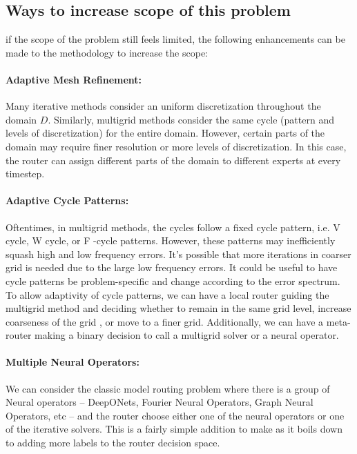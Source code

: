 \documentclass[12pt]{article}
\begin{document}
\subsection{Ways to increase scope of this problem}


if the scope of the problem still feels limited, the following enhancements can be made to the methodology to increase the scope:

\paragraph{Adaptive Mesh Refinement:} Many iterative methods consider an uniform discretization throughout the domain $D$. Similarly, multigrid methods consider the same cycle (pattern and levels of discretization) for the entire domain. However, certain parts of the domain may require finer resolution or more levels of discretization. In this case, the router can assign different parts of the domain to different experts at every timestep. 

\paragraph{Adaptive Cycle Patterns:} Oftentimes, in multigrid methods, the cycles follow a fixed cycle pattern, i.e. V cycle, W cycle, or F -cycle patterns. However, these patterns may inefficiently squash high and low frequency errors. It's possible that more iterations in coarser grid is needed due to the large low frequency errors. It could be useful to have cycle patterns be problem-specific and change according to the error spectrum. To allow adaptivity of cycle patterns, we can have a local router guiding the multigrid method and deciding whether to remain in the same grid level, increase coarseness of the grid , or move to a finer grid. Additionally, we can have a meta-router making a binary decision to call a multigrid solver or a neural operator. 

\paragraph{Multiple Neural Operators:} We can consider the classic model routing problem where there is a group of Neural operators -- DeepONets, Fourier Neural Operators, Graph Neural Operators, etc -- and the router choose either one of the neural operators or one of the iterative solvers. This is a fairly simple addition to make as it boils down to adding more labels to the router decision space. 
\end{document}
